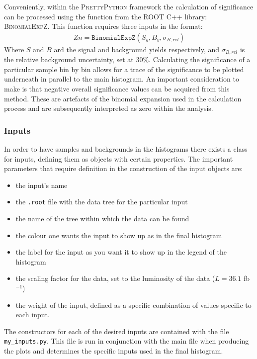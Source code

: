 Conveniently, within the P{\scshape rettyPython} framework the calculation of significance can be processed using the function from the ROOT C++ library: B{\scshape inomialExpZ}.
This function requires three inputs in the format:
\begin{align}
Zn = \texttt{BinomialExpZ}(S_{y}, B_{y}, \sigma_{B, rel})
\end{align}
Where $S$ and $B$ ard the signal and background yields respectively, and $\sigma_{B, rel}$ is the relative background uncertainty, set at $30\%$.
Calculating the significance of a particular sample bin by bin allows for a trace of the significance to be plotted underneath in parallel to the main histogram.
An important consideration to make is that negative overall significance values can be acquired from this method.
These are artefacts of the binomial expansion used in the calculation process and are subsequently interpreted as zero within the analysis.

\subsubsection{Inputs}

In order to have samples and backgrounds in the histograms there exists a class for inputs, defining them as objects with certain properties.
The important parameters that require definition in the construction of the input objects are:
\begin{itemize}
\item the input's name
\item the \texttt{.root} file with the data tree for the particular input
\item the name of the tree within which the data can be found
\item the colour one wants the input to show up as in the final histogram
\item the label for the input as you want it to show up in the legend of the histogram
\item the scaling factor for the data, set to the luminosity of the data ($L = 36.1$ fb$^{-1}$)
\item the weight of the input, defined as a specific combination of values specific to each input.
\end{itemize}

\noindent The constructors for each of the desired inputs are contained with the file \texttt{my\_inputs.py}.
This file is run in conjunction with the main file when producing the plots and determines the specific inputs used in the final histogram.

